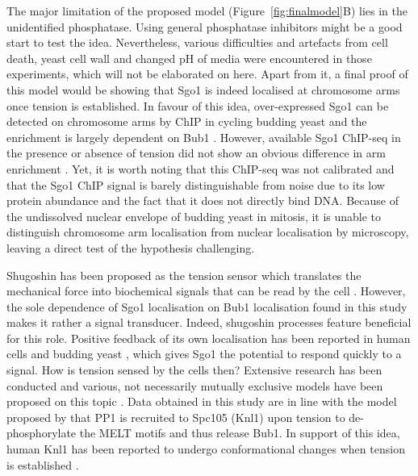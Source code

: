 The major limitation of the proposed model (Figure~\ref{fig:finalmodel}B) lies in the unidentified phosphatase. Using general phosphatase inhibitors might be a good start to test the idea. Nevertheless, various difficulties and artefacts from cell death, yeast cell wall and changed pH of media were encountered in those experiments, which will not be elaborated on here. Apart from it, a final proof of this model would be showing that Sgo1 is indeed localised at chromosome arms once tension is established. In favour of this idea, over-expressed Sgo1 can be detected on chromosome arms by ChIP in cycling budding yeast and the enrichment is largely dependent on Bub1 \citep{Clift2009}. However, available Sgo1 ChIP-seq in the presence or absence of tension did not show an obvious difference in arm enrichment \citep{Paldi2020ConvergentPericentromeres}. Yet, it is worth noting that this ChIP-seq was not calibrated and that the Sgo1 ChIP signal is barely distinguishable from noise due to its low protein abundance and the fact that it does not directly bind DNA. Because of the undissolved nuclear envelope of budding yeast in mitosis, it is unable to distinguish chromosome arm localisation from nuclear localisation by microscopy, leaving a direct test of the hypothesis challenging. 

Shugoshin has been proposed as the tension sensor which translates the mechanical force into biochemical signals that can be read by the cell \citep{Indjeian2005a, Nerusheva2014, Marston2015}. However, the sole dependence of Sgo1 localisation on Bub1 localisation found in this study makes it rather a signal transducer. Indeed, shugoshin processes feature beneficial for this role. Positive feedback of its own localisation has been reported in human cells \citep{Liang2019ACells} and budding yeast \citep{Roy2019}, which gives Sgo1 the potential to respond quickly to a signal. How is tension sensed by the cells then? Extensive research has been conducted and various, not necessarily mutually exclusive models have been proposed on this topic \citep{Hindriksen2017TheLocalization, McVey2021AuroraSegregation, Broad2020AuroraCells}. Data obtained in this study are in line with the model proposed by \cite{Roy2019} that PP1 is recruited to Spc105 (Knl1) upon tension to de-phosphorylate the MELT motifs and thus release Bub1. In support of this idea, human Knl1 has been reported to undergo conformational changes when tension is established \citep{Roscioli2020}. 

